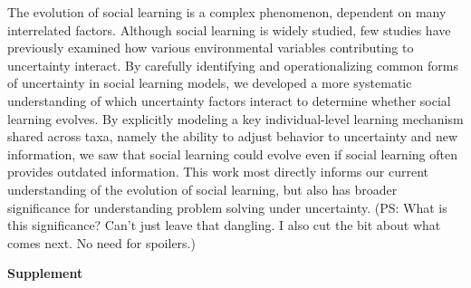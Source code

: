 \documentclass[letterpaper,11.5pt]{scrartcl}
\newcommand{\ps}[1]{{\textcolor{mygreen} {({\tiny PS:} #1)}}}
\begin{document}
The evolution of social learning is a complex phenomenon, dependent on many interrelated factors. Although social learning is widely studied, few studies have previously examined how various environmental variables contributing to uncertainty interact. 
By carefully identifying and operationalizing common forms of  uncertainty in social learning models, we developed a more systematic
understanding of which uncertainty factors interact to determine whether social
learning evolves. By explicitly modeling a key individual-level learning mechanism
shared across taxa, namely the ability to adjust behavior to uncertainty and new
information, we saw that social learning could evolve even if social learning
often provides outdated information. This work most directly informs our current understanding of the evolution of social learning, but also has broader significance for
understanding problem solving under uncertainty. \ps{What is this significance? Can't just leave that dangling. I also cut the bit about what comes next. No need for spoilers.} 



% 



\pagebreak
\begin{center}
  \textbf{\Large \textsf{Supplement}}
\end{center}
\setcounter{equation}{1}
\setcounter{figure}{0}
\setcounter{section}{0}
\setcounter{table}{0}
\setcounter{page}{1}
\makeatletter
\renewcommand{\theequation}{S\arabic{equation}}
\renewcommand{\thefigure}{S\arabic{figure}}
\renewcommand{\thetable}{S\arabic{table}}
\renewcommand{\thesection}{S\arabic{section}}
\renewcommand{\thepage}{S\arabic{page}}
\end{document}
